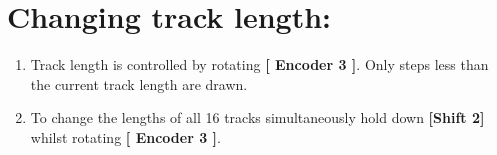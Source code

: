 \section{Changing track length:}
\begin{enumerate}
	\item Track length is controlled by rotating \textbf{[ Encoder 3 ]}. Only steps less than the current track length are drawn.
	\item To change the lengths of all 16 tracks simultaneously hold down \textbf{[Shift 2]} whilst rotating \textbf{[ Encoder 3 ]}.
\end{enumerate}

